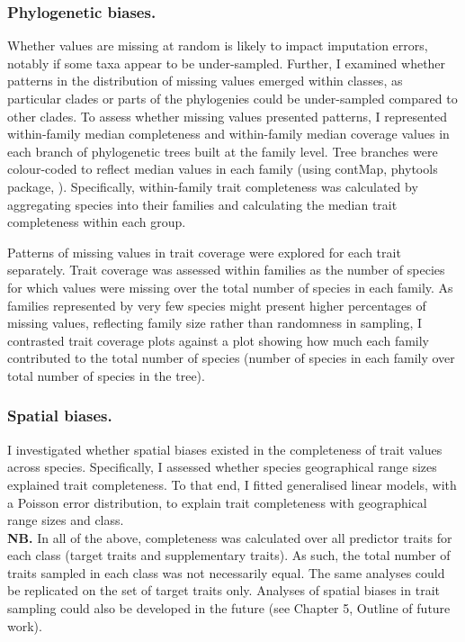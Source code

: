 \subsubsection{Phylogenetic biases.}
Whether values are missing at random is likely to impact imputation errors, notably if some taxa appear to be under-sampled. Further, I examined whether patterns in the distribution of missing values emerged within classes, as particular clades or parts of the phylogenies could be under-sampled compared to other clades. To assess whether missing values presented patterns, I represented within-family median completeness and within-family median coverage values in each branch of phylogenetic trees built at the family level. Tree branches were colour-coded to reflect median values in each family (using contMap, phytools package, \cite{Revell2016}). Specifically, within-family trait completeness was calculated by aggregating species into their families and calculating the median trait completeness within each group. 

Patterns of missing values in trait coverage were explored for each trait separately. Trait coverage was assessed within families as the number of species for which values were missing over the total number of species in each family. As families represented by very few species might present higher percentages of missing values, reflecting family size rather than randomness in sampling, I contrasted trait coverage plots against a plot showing how much each family contributed to the total number of species (number of species in each family over total number of species in the tree).

\subsubsection{Spatial biases.} I investigated whether spatial biases existed in the completeness of trait values across species. Specifically, I assessed whether species geographical range sizes explained trait completeness. To that end, I fitted generalised linear models, with a Poisson error distribution, to explain trait completeness with geographical range sizes and class.\\

\textbf{NB.} In all of the above, completeness was calculated over all predictor traits for each class (target traits and supplementary traits). As such, the total number of traits sampled in each class was not necessarily equal. The same analyses could be replicated on the set of target traits only. Analyses of spatial biases in trait sampling could also be developed in the future (see Chapter 5, Outline of future work).\\

